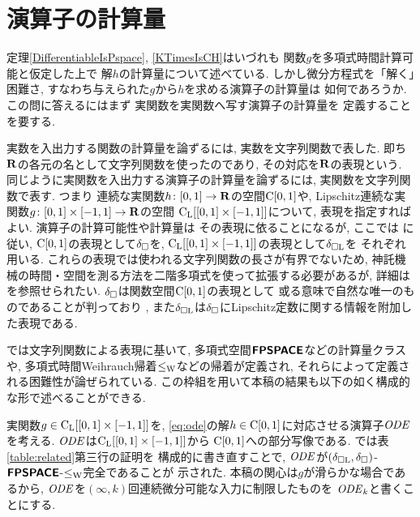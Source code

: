 \section{演算子の計算量}

定理\ref{DifferentiableIsPspace}, 
\ref{KTimesIsCH}はいづれも
関数$g$を多項式時間計算可能と仮定した上で
解$h$の計算量について述べている. 
しかし微分方程式を「解く」困難さ, 
すなわち与えられた$g$から$h$を求める演算子の計算量は
如何であろうか. 
この問に答えるにはまず
実関数を実関数へ写す演算子の計算量を
定義することを要する. 

実数を入出力する関数の計算量を論ずるには, 
実数を文字列関数で表した. 
即ち$\mathbf R$の各元の名として文字列関数を使ったのであり, 
その対応を$\mathbf R$の表現という. 
同じように実関数を入出力する演算子の計算量を論ずるには, 
実関数を文字列関数で表す. 
つまり
連続な実関数$h \colon [0,1] \to \mathbf R$の空間$\mathrm C [0, 1]$や, 
Lipschitz連続な実関数$g \colon [0, 1] \times [-1, 1] \to \mathbf R$の空間
$\mathrm C _{\mathrm L} [[0, 1] \times [-1, 1]]$について, 
表現を指定すればよい. 
演算子の計算可能性や計算量は
その表現に依ることになるが, 
ここでは
\cite{kawamura2010operators}に従い, 
$\mathrm C [0, 1]$の表現として$\delta _\square$を, 
$\mathrm C _{\mathrm L} [[0, 1] \times [-1, 1]]$の表現として$\delta _{\square \mathrm L}$を
それぞれ用いる. 
これらの表現では使われる文字列関数の長さが有界でないため, 
神託機械の時間・空間を測る方法を二階多項式を使って拡張する必要があるが, 
詳細は\cite{kawamura2010operators}を参照せられたい. 
$\delta _\square$は関数空間$\mathrm C [0, 1]$の表現として
或る意味で自然な唯一のものであることが判っており
\cite{kawamura11:_funct_space_repres_and_polyn_time_comput}, 
また$\delta _{\square \mathrm L}$は$\delta _\square$にLipschitz定数に関する情報を附加した表現である. 

\cite{kawamura2010operators}では文字列関数による表現に基いて, 
多項式空間$\text{\bfseries \sffamily \upshape FPSPACE}$などの計算量クラスや, 
多項式時間Weihrauch帰着$\leq _{\mathrm W}$などの帰着が定義され, 
それらによって定義される困難性が論ぜられている. 
この枠組を用いて本稿の結果も以下の如く構成的な形で述べることができる. 

実関数$g \in \mathrm C _{\mathrm L} [[0, 1] \times [-1, 1]]$を, 
\eqref{eq:ode}の解$h \in \mathrm C [0, 1]$に対応させる演算子$\mathit{ODE}$を考える. 
$\mathit{ODE}$は$\mathrm C _{\mathrm L} [[0, 1] \times [-1, 1]]$から
$\mathrm C [0, 1]$への部分写像である. 
\cite[Theorem~4.9]{kawamura2010operators}では表\ref{table:related}第三行の証明を
構成的に書き直すことで, 
$\mathit{ODE}$が$(\delta _{\square \mathrm L}, \delta _\square)$-$\text{\bfseries \sffamily \upshape FPSPACE}$-$\leq _{\mathrm W}$完全であることが
示された. 
本稿の関心は$g$が滑らかな場合であるから, 
$\mathit{ODE}$を$(\infty, k)$回連続微分可能な入力に制限したものを
$\mathit{ODE} _k$と書くことにする. 

